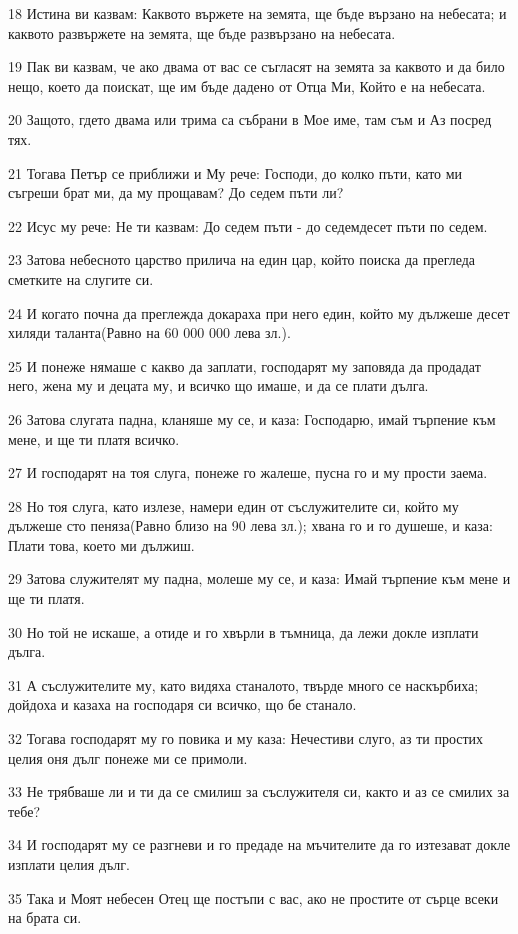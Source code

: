 \par 18 Истина ви казвам: Каквото вържете на земята, ще бъде вързано на небесата; и каквото развържете на земята, ще бъде развързано на небесата.
\par 19 Пак ви казвам, че ако двама от вас се съгласят на земята за каквото и да било нещо, което да поискат, ще им бъде дадено от Отца Ми, Който е на небесата.
\par 20 Защото, гдето двама или трима са събрани в Мое име, там съм и Аз посред тях.
\par 21 Тогава Петър се приближи и Му рече: Господи, до колко пъти, като ми съгреши брат ми, да му прощавам? До седем пъти ли?
\par 22 Исус му рече: Не ти казвам: До седем пъти - до седемдесет пъти по седем.
\par 23 Затова небесното царство прилича на един цар, който поиска да прегледа сметките на слугите си.
\par 24 И когато почна да преглежда докараха при него един, който му дължеше десет хиляди таланта(Равно на 60 000 000 лева зл.).
\par 25 И понеже нямаше с какво да заплати, господарят му заповяда да продадат него, жена му и децата му, и всичко що имаше, и да се плати дълга.
\par 26 Затова слугата падна, кланяше му се, и каза: Господарю, имай търпение към мене, и ще ти платя всичко.
\par 27 И господарят на тоя слуга, понеже го жалеше, пусна го и му прости заема.
\par 28 Но тоя слуга, като излезе, намери един от съслужителите си, който му дължеше сто пеняза(Равно близо на 90 лева зл.); хвана го и го душеше, и каза: Плати това, което ми дължиш.
\par 29 Затова служителят му падна, молеше му се, и каза: Имай търпение към мене и ще ти платя.
\par 30 Но той не искаше, а отиде и го хвърли в тъмница, да лежи докле изплати дълга.
\par 31 А съслужителите му, като видяха станалото, твърде много се наскърбиха; дойдоха и казаха на господаря си всичко, що бе станало.
\par 32 Тогава господарят му го повика и му каза: Нечестиви слуго, аз ти простих целия оня дълг понеже ми се примоли.
\par 33 Не трябваше ли и ти да се смилиш за съслужителя си, както и аз се смилих за тебе?
\par 34 И господарят му се разгневи и го предаде на мъчителите да го изтезават докле изплати целия дълг.
\par 35 Така и Моят небесен Отец ще постъпи с вас, ако не простите от сърце всеки на брата си.

